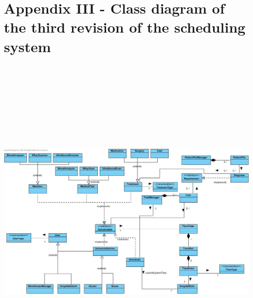 \documentclass[11pt]{article}
\begin{document}
\section{Appendix III - Class diagram of the third revision of the scheduling system}
\includegraphics[width=200mm, height=170mm, angle=90]{schedulerwin.jpg}
\end{document}
